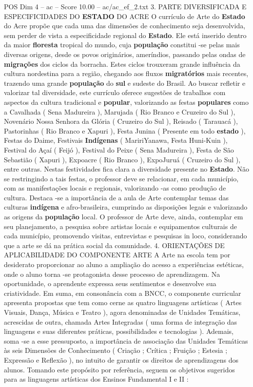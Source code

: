 \begin{textsample}{POS Dim 4 – ac – Score 10.00 – ac/ac\_ef\_2.txt}  \label{ex:f4_pos_241}
3.
PARTE DIVERSIFICADA E ESPECIFICIDADES DO \textbf{ESTADO} DO ACRE O currículo de Arte do \textbf{Estado} do Acre propõe que cada uma das dimensões de conhecimento seja desenvolvida, sem perder de vista a especificidade regional do \textbf{Estado}.
Ele está inserido dentro da maior \textbf{floresta} tropical do mundo, cuja \textbf{população} constitui -se pelas mais diversas origens, desde os povos originários, ameríndios, passando pelas ondas de \textbf{migrações} dos ciclos da borracha.
Estes ciclos trouxeram grande influência da cultura nordestina para a região, chegando aos fluxos \textbf{migratórios} mais recentes, trazendo uma grande \textbf{população} do \textbf{sul} e sudeste do Brasil.
Ao buscar refletir e valorizar tal diversidade, este currículo oferece sugestões de trabalhos com aspectos da cultura tradicional e \textbf{popular}, valorizando as festas \textbf{populares} como a Cavalhada ( Sena Madureira ), Marujada ( Rio Branco e Cruzeiro do Sul ), Novenário Nossa Senhora da Glória ( Cruzeiro do Sul ), Reisado ( Tarauacá ), Pastorinhas ( Rio Branco e Xapuri ), Festa Junina ( Presente em todo \textbf{estado} ), Festas do Daime, Festivais \textbf{Indígenas} ( MaririYanawa, Festa Huni-Kuin ), Festival do Açaí ( Feijó ), Festival do Peixe ( Sena Madureira ), Festa de São Sebastião ( Xapuri ), Expoacre ( Rio Branco ), ExpoJuruá ( Cruzeiro do Sul ), entre outras.
Nestas festividades fica clara a diversidade presente no \textbf{Estado}.
Não se restringindo a tais festas, o professor deve se relacionar, em cada município, com as manifestações locais e regionais, valorizando -as como produção de cultura.
Destaca -se a importância de a aula de Arte contemplar temas das culturas \textbf{indígena} e afro-brasileira, cumprindo as disposições legais e valorizando as origens da \textbf{população} local.
O professor de Arte deve, ainda, contemplar em seu planejamento, a pesquisa sobre artistas locais e equipamentos culturais de cada município, promovendo visitas, entrevistas e pesquisas in loco, considerando que a arte se dá na prática social da comunidade. 4.
ORIENTAÇÕES DE APLICABILIDADE DO COMPONENTE ARTE A Arte na escola tem por desiderato proporcionar ao aluno a ampliação do acesso a experiências estéticas, onde o aluno torna -se protagonista desse processo de aprendizagem.
Na oportunidade, o aprendente expressa seus sentimentos e desenvolve sua criatividade.
Em suma, em consonância com a BNCC, o componente curricular apresenta propostas que tem como cerne as quatro linguagens artísticas ( Artes Visuais, Dança, Música e Teatro ), agora denominadas de Unidades Temáticas, acrescidas de outra, chamada Artes Integradas ( uma forma de integração das linguagens e suas diferentes práticas, possibilidades e tecnologias ).
Ademais, soma -se a esse pressuposto, a importância de associação das Unidades Temáticas às seis Dimensões de Conhecimento ( Criação ; Crítica ; Fruição ; Estesia ; Expressão e Reflexão ), no intuito de garantir os direitos de aprendizagens dos alunos.
Tomando este propósito por referência, seguem os objetivos sugeridos para as linguagens artísticas dos Ensinos Fundamental I e II :

\end{textsample}
